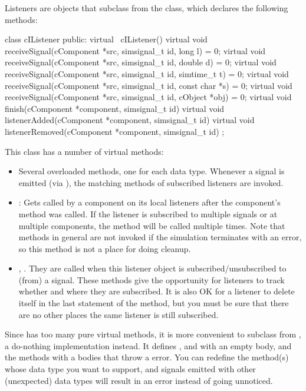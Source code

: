 Listeners are objects that subclass from the  class, which
declares the following methods:

\begin{cpp}
class cIListener
{
  public:
    virtual ~cIListener() {}
    virtual void receiveSignal(cComponent *src, simsignal_t id, long l) = 0;
    virtual void receiveSignal(cComponent *src, simsignal_t id, double d) = 0;
    virtual void receiveSignal(cComponent *src, simsignal_t id, simtime_t t) = 0;
    virtual void receiveSignal(cComponent *src, simsignal_t id, const char *s) = 0;
    virtual void receiveSignal(cComponent *src, simsignal_t id, cObject *obj) = 0;
    virtual void finish(cComponent *component, simsignal_t id) {}
    virtual void listenerAdded(cComponent *component, simsignal_t id) {}
    virtual void listenerRemoved(cComponent *component, simsignal_t id) {}
};
\end{cpp}

This class has a number of virtual methods:

\begin{itemize}
  \item Several overloaded  methods, one for each
    data type. Whenever a signal is emitted (via ),
    the matching  methods of subscribed listeners
    are invoked.
  \item {}: Gets called by a component on its local listeners
    after the component's  method was called. If the listener
    is subscribed to multiple signals or at multiple components, the method
    will be called multiple times. Note that  methods in general
    are not invoked if the simulation terminates with an error, so this method
    is not a place for doing cleanup.
  \item {}, . They are called
    when this listener object is subscribed/unsubscribed to (from) a signal.
    These methods give the opportunity for listeners to track whether
    and where they are subscribed. It is also OK for a listener to delete
    itself in the last statement of the  method,
    but you must be sure that there are no other places the same listener
    is still subscribed.
\end{itemize}

Since  has too many pure virtual methods, it is more
convenient to subclass from , a do-nothing implementation
instead. It defines ,  and
 with an empty body, and the 
methods with a bodies that throw a  error.
You can redefine the  method(s) whose data type
you want to support, and signals emitted with other (unexpected) data
types will result in an error instead of going unnoticed.

